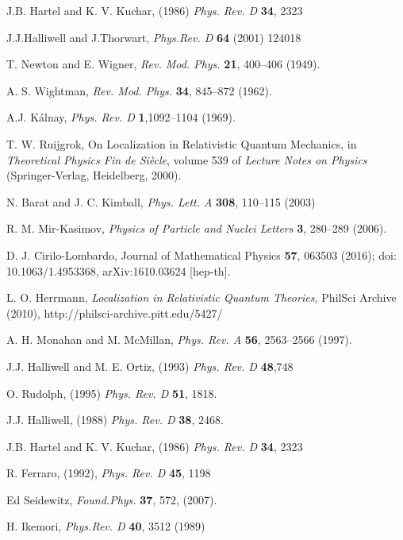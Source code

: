 \documentclass{article}
\begin{document}
\begin{thebibliography}{000}
   J.B. Hartel and K. V. Kuchar, (1986) \textit{Phys. Rev. D} \textbf{34}, 2323
  
  J.J.Halliwell and J.Thorwart, \textit{Phys.Rev. D} \textbf{64} (2001) 124018
  
  T. Newton and E. Wigner, 
{\it Rev. Mod. Phys.} {\bf 21}, 400--406 (1949).
  
  A. S. Wightman,  {\it Rev. Mod. Phys.}
{\bf 34}, 845--872 (1962).

  A.J. K\'alnay, 
{\it Phys. Rev. D} {\bf 1},1092--1104 (1969).
 
  T. W. Ruijgrok, On Localization in Relativistic Quantum Mechanics,
in {\it Theoretical Physics Fin de Si\`ecle},
volume 539 of {\it Lecture Notes on Physics} (Springer-Verlag, Heidelberg, 2000).
 
   N. Barat and J. C. Kimball, 
{\it Phys. Lett. A} {\bf 308}, 110--115 (2003)
 
  R. M. Mir-Kasimov, {\it Physics of Particle and Nuclei Letters}
{\bf 3}, 280--289 (2006).
 
  D. J. Cirilo-Lombardo,  Journal of Mathematical Physics {\bf 57}, 063503 (2016); doi: 10.1063/1.4953368,
arXiv:1610.03624 [hep-th].
 
  L. O. Herrmann,  \textit{Localization in Relativistic Quantum Theories,}  PhilSci Archive (2010),
http://philsci-archive.pitt.edu/5427/
 
  A. H. Monahan and M. McMillan, {\it Phys. Rev. A} {\bf 56}, 2563--2566 (1997).

 
 
  
  J.J. Halliwell and M. E. Ortiz, (1993) \textit{Phys. Rev. D} \textbf{48},748
  
 O. Rudolph,  (1995) \textit{Phys. Rev. D} \textbf{51}, 1818.
 
  
  
  J.J. Halliwell, (1988) \textit{Phys. Rev. D} \textbf{38}, 2468.
 
  
   J.B. Hartel and K. V. Kuchar, (1986) \textit{Phys. Rev. D} \textbf{34}, 2323

   R. Ferraro, (1992), \textit{Phys. Rev. D} \textbf{45}, 1198
   
  Ed Seidewitz, \textit{Found.Phys.} \textbf{37}, 572, (2007).
 
  H. Ikemori,  \textit{Phys.Rev. D} \textbf{40},  3512 (1989)
  

\end{thebibliography}
\end{document}
